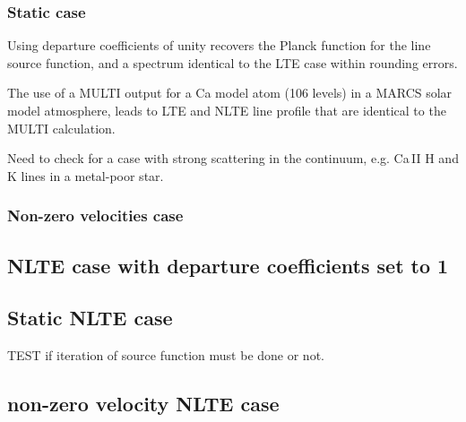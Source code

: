 \documentclass[a4paper,12pt]{article}
\begin{document}
\subsubsection{Static case}
Using departure coefficients of unity recovers the Planck function for the line source function, and a spectrum identical 
to the LTE case within rounding errors.

The use of a MULTI output for a Ca model atom (106 levels) in a MARCS solar model atmosphere, leads  to
LTE and NLTE line profile that are identical to the MULTI calculation.

Need to check for a case with strong scattering in the continuum, e.g. Ca\,II H and K lines in a metal-poor star.

\subsubsection{Non-zero velocities case}
\subsection{NLTE case with departure coefficients set to 1}
\subsection{Static NLTE case}

TEST if iteration of source function must be done or not.

\subsection{non-zero velocity NLTE case}
\end{document}
